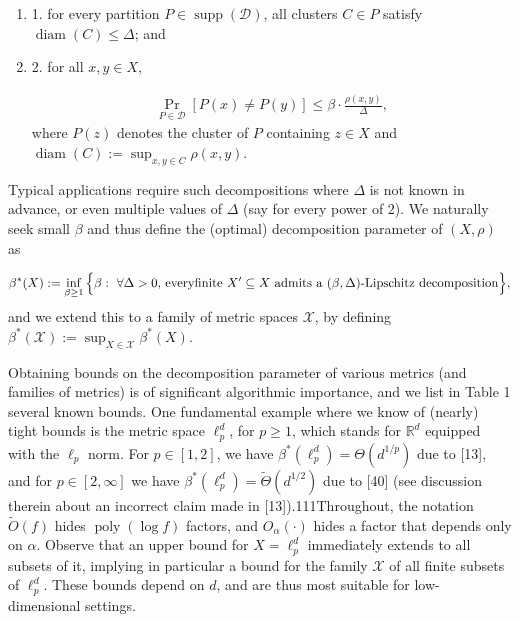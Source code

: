 \documentclass[10pt,a4paper]{amsart}
\begin{document}
\begin{enumerate}
\item  1. 
for every partition $P\in\operatorname{supp}(\mathcal{D})$, all clusters $C\in P$ satisfy $\operatorname{diam}(C)\leq\Delta$; and
\par
\par
\item  2. 
for all $x,y\in X$,
\par
\[\begin{aligned}
\Pr_{P\in\mathcal{D}}[P(x)\neq P(y)]\leq\beta\cdot\tfrac{\rho(x,y)}{\Delta},
\end{aligned}\]
where $P(z)$ denotes the cluster of $P$ containing $z\in X$ and $\operatorname{diam}(C):=\sup_{x,y\in C}\rho(x,y)$.
\par
\par
\end{enumerate}
\par
\par
Typical applications require such decompositions where $\Delta$ is not known in advance, or even multiple values of $\Delta$ (say for every power of $2$). We naturally seek small $\beta$ and thus define the (optimal) decomposition parameter of $(X,\rho)$ as
\par
\[\begin{aligned}
\beta^{*}(X):=\inf_{\beta\geq 1}\Big{\{}\beta:\ \text{$\forall\Delta>0$, every%
 finite $X^{\prime}\subseteq X$
admits a $(\beta,\Delta)$-Lipschitz decomposition}\Big{\}},
\end{aligned}\]
and we extend this to a family of metric spaces $\mathcal{X}$, by defining $\beta^{*}(\mathcal{X}):=\sup_{X\in\mathcal{X}}\beta^{*}(X)$.
\par
\par
Obtaining bounds on the decomposition parameter of various metrics (and families of metrics) is of significant algorithmic importance, and we list in Table 1 several known bounds. One fundamental example where we know of (nearly) tight bounds is the metric space $\ell_{p}^{d}$, for $p\geq 1$, which stands for $\mathbb{R}^{d}$ equipped with the $\ell_{p}$ norm. For $p\in[1,2]$, we have $\beta^{*}(\ell_{p}^{d})=\Theta(d^{1/p})$ due to [13], and for $p\in[2,\infty]$ we have $\beta^{*}(\ell_{p}^{d})=\tilde{\Theta}(d^{1/2})$ due to [40] (see discussion therein about an incorrect claim made in [13]).111Throughout, the notation $\tilde{O}(f)$ hides $\operatorname{poly}(\log f)$ factors, and $O_{\alpha}(\cdot)$ hides a factor that depends only on $\alpha$. Observe that an upper bound for $X=\ell_{p}^{d}$ immediately extends to all subsets of it, implying in particular a bound for the family $\mathcal{X}$ of all finite subsets of $\ell_{p}^{d}$. These bounds depend on $d$, and are thus most suitable for low-dimensional settings.
\end{document}
